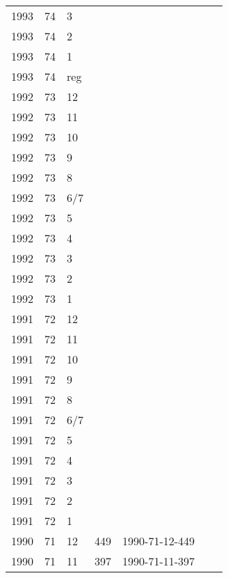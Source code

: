 \begin{longtable}{ |l|l|l|l|p{2.7cm}|l|p{2cm}| }
 1993 & 74 &     3 &         &                &  & \\
 1993 & 74 &     2 &         &                &  & \\
 1993 & 74 &     1 &         &                &  & \\
 1993 & 74 &   reg &         &                &  & \\
 1992 & 73 &    12 &         &                &  & \\
 1992 & 73 &    11 &         &                &  & \\
 1992 & 73 &    10 &         &                &  & \\
 1992 & 73 &     9 &         &                &  & \\
 1992 & 73 &     8 &         &                &  & \\
 1992 & 73 &   6/7 &         &                &  & \\
 1992 & 73 &     5 &         &                &  & \\
 1992 & 73 &     4 &         &                &  & \\
 1992 & 73 &     3 &         &                &  & \\
 1992 & 73 &     2 &         &                &  & \\
 1992 & 73 &     1 &         &                &  & \\
 1991 & 72 &    12 &         &                &  & \\
 1991 & 72 &    11 &         &                &  & \\
 1991 & 72 &    10 &         &                &  & \\
 1991 & 72 &     9 &         &                &  & \\
 1991 & 72 &     8 &         &                &  & \\
 1991 & 72 &   6/7 &         &                &  & \\
 1991 & 72 &     5 &         &                &  & \\
 1991 & 72 &     4 &         &                &  & \\
 1991 & 72 &     3 &         &                &  & \\
 1991 & 72 &     2 &         &                &  & \\
 1991 & 72 &     1 &         &                &  & \\
 1990 & 71 &    12 &   449   & 1990-71-12-449 &  & \\
 1990 & 71 &    11 &    397  & 1990-71-11-397 &  & \\

\end{longtable}
